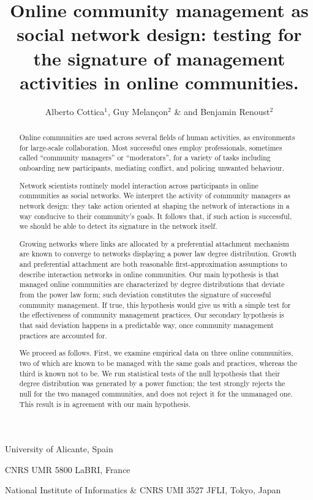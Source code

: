 \documentclass{nature}
\title{Online community management as social network design: testing for the signature of management activities in online communities.}
\author{Alberto Cottica$^1$, Guy Melan\c {c}on$^2$ \& and Benjamin Renoust$^2$}
\begin{document}
\maketitle

\begin{affiliations}
 \item University of Alicante, Spain
 \item CNRS UMR 5800 LaBRI, France
 \item National Institute of Informatics \& CNRS UMI 3527 JFLI, Tokyo, Japan
\end{affiliations}

\begin{abstract}
Online communities are used across several fields of human activities, as environments for large-scale collaboration. Most successful ones employ professionals, sometimes called ``community managers'' or ``moderators'', for a variety of tasks including onboarding new participants, mediating conflict, and policing unwanted behaviour. 

Network scientists routinely model interaction across participants in online communities as social networks. We interpret the activity of community managers as network design: they take action oriented at shaping the network of interactions in a way conducive to their community's goals. It follows that, if such action is successful, we should be able to detect its signature in the network itself. 

Growing networks where links are allocated by a preferential attachment mechanism are known to converge to networks displaying a power law degree distribution. Growth and preferential attachment are both reasonable first-approximation assumptions to describe interaction networks in online communities. Our main hypothesis is that managed online communities are characterized by degree distributions that deviate from the power law form; such deviation constitutes the signature of successful community management. If true, this hypothesis would give us with a simple test for the effectiveness of community management practices. Our secondary hypothesis is that said deviation happens in a predictable way, once community management practices are accounted for.

We proceed as follows. First, we examine empirical data on three online communities, two of which are known to be managed with the same goals and practices, whereas the third is known not to be. We run statistical tests of the null hypothesis that their degree distribution was generated by a power function; the test strongly rejects the null for the two managed communities, and does not reject it for the unmanaged one. This result is in agreement with our main hypothesis.


\end{abstract}
\end{document}
